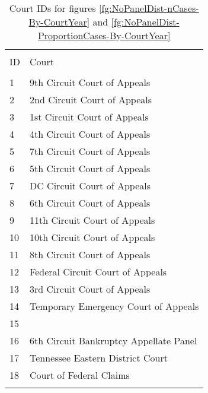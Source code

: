 \documentclass[10pt, letterpaper]{article}
\begin{document}
\begin{spacing}{1.0}
\begin{table}
    \centering
    \caption{Court IDs for figures \ref{fg:NoPanelDist-nCases-By-CourtYear} and \ref{fg:NoPanelDist-ProportionCases-By-CourtYear}}
    \begin{tabular}{ll}
        \hline\\[-6pt]
        ID & Court\\[2pt]
        \hline\\[-6pt]
        1 & 9th Circuit Court of Appeals\\
        2 & 2nd Circuit Court of Appeals\\
        3 & 1st Circuit Court of Appeals\\
        4 & 4th Circuit Court of Appeals\\
        5 & 7th Circuit Court of Appeals\\
        6 & 5th Circuit Court of Appeals\\
        7 & DC Circuit Court of Appeals\\
        8 & 6th Circuit Court of Appeals\\
        9 & 11th Circuit Court of Appeals\\
        10 & 10th Circuit Court of Appeals\\
        11 & 8th Circuit Court of Appeals\\
        12 & Federal Circuit Court of Appeals\\
        13 & 3rd Circuit Court of Appeals\\
        14 & Temporary Emergency Court of Appeals\\
        15 &                                       \\
        16 & 6th Circuit Bankruptcy Appellate Panel\\
        17 & Tennessee Eastern District Court\\
        18 & Court of Federal Claims\\
        \hline\\[-6pt]
    \end{tabular}
    \label{tb:CourtID01}
\end{table}

\clearpage

\small


\end{spacing}
\end{document}
